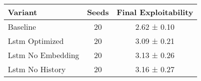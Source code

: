 \begin{tabular}{lcc}
\toprule
Variant & Seeds & Final Exploitability \\
\midrule
Baseline & 20 & 2.62 ± 0.10 \\
Lstm Optimized & 20 & 3.09 ± 0.21 \\
Lstm No Embedding & 20 & 3.13 ± 0.26 \\
Lstm No History & 20 & 3.16 ± 0.27 \\
\bottomrule
\end{tabular}
